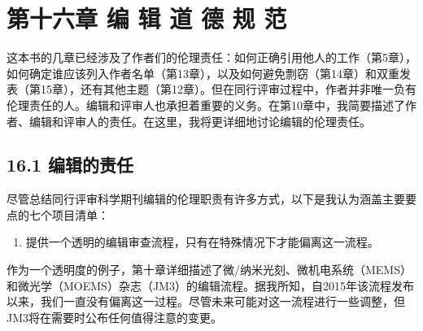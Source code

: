 \section*{第十六章 编 辑 道 德 规 范}
这本书的几章已经涉及了作者们的伦理责任：如何正确引用他人的工作（第5章），如何确定谁应该列入作者名单（第13章），以及如何避免剽窃（第14章）和双重发表（第15章），还有其他主题（第12章）。但在同行评审过程中，作者并非唯一负有伦理责任的人。编辑和评审人也承担着重要的义务。在第10章中，我简要描述了作者、编辑和评审人的责任。在这里，我将更详细地讨论编辑的伦理责任。

\subsection*{16.1 编辑的责任}
尽管总结同行评审科学期刊编辑的伦理职责有许多方式，以下是我认为涵盖主要要点的七个项目清单：

\begin{enumerate}
\item 提供一个透明的编辑审查流程，只有在特殊情况下才能偏离这一流程。
\end{enumerate}

作为一个透明度的例子，第十章详细描述了微/纳米光刻、微机电系统（MEMS）和微光学（MOEMS）杂志（JM3）的编辑流程。据我所知，自2015年该流程发布以来，我们一直没有偏离这一过程。尽管未来可能对这一流程进行一些调整，但JM3将在需要时公布任何值得注意的变更。

